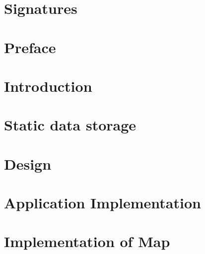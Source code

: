 






\thispagestyle{empty}
\cleardoublepage


\chapter*{Signatures}


\newpage
\thispagestyle{empty}
\mbox{}

\chapter*{Preface}
\thispagestyle{empty}


\newpage
\thispagestyle{empty}
\mbox{}

\newpage
\thispagestyle{empty}
\mbox{}

\setcounter{secnumdepth}{3}
\setcounter{tocdepth}{1}

\tableofcontents*

\acresetall %

\chapter{Introduction}\label{chap:intro}




\chapter{Static data storage}


\chapter{Design}



\chapter{Application Implementation}




\chapter{Implementation of Map}



